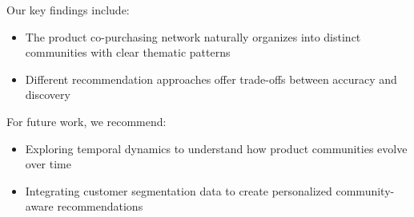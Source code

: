 \documentclass[conference]{IEEEtran}
\begin{document}
Our key findings include:

\begin{itemize}
    \item The product co-purchasing network naturally organizes into distinct communities with clear thematic patterns
    \item Different recommendation approaches offer trade-offs between accuracy and discovery
\end{itemize}

For future work, we recommend:

\begin{itemize}
    \item Exploring temporal dynamics to understand how product communities evolve over time
    \item Integrating customer segmentation data to create personalized community-aware recommendations

\end{itemize}



\end{document}
